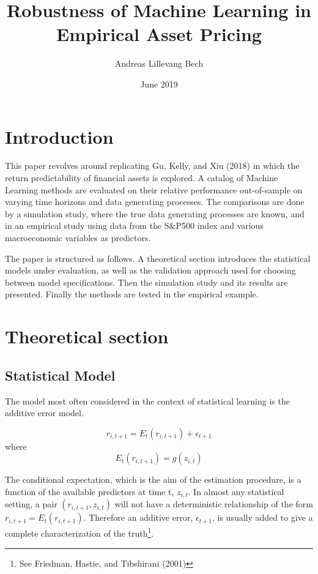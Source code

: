 \documentclass[11pt]{article}
\title{Robustness of Machine Learning in \protect\\
  Empirical Asset Pricing}
\author{Andreas Lillevang Bech}
\date{June 2019}
\let\rmarkdownfootnote\footnote%
\def\footnote{\protect\rmarkdownfootnote}
\begin{document}
\maketitle

\hypertarget{introduction}{%
\section{Introduction}\label{introduction}}

This paper revolves around replicating Gu, Kelly, and Xiu (2018) in
which the return predictability of financial assets is explored. A
catalog of Machine Learning methods are evaluated on their relative
performance out-of-sample on varying time horizons and data generating processes.
The comparisons are done by a simulation study, where the true data generating processes are known, and in an empirical study using data from the S\&P500 index and various macroeconomic variables as predictors.

The paper is structured as follows. A theoretical section introduces the
statistical models under evaluation, as well as the validation approach used for
choosing between model specifications. Then the simulation study and its results are presented. Finally the methods are tested in the empirical example.

\hypertarget{theoretical-section}{%
\section{Theoretical section}\label{theoretical-section}}

\hypertarget{statistical-model}{%
\subsection{Statistical Model}\label{statistical-model}}

The model most often considered in the context of statistical learning
is the additive error model.

\[r_{i,t+1} = E_t(r_{i,t+1}) + \epsilon_{t+1}\] where
\[E_t(r_{i,t+1}) = g(z_{i,t})\]

The conditional expectation, which is the aim of the estimation
procedure, is a function of the available predictors at time t,
\(z_{i,t}\). In almost any statistical setting, a pair \((r_{i,t+1},z_{i,t})\)
will not have a deterministic relationship of the form
\(r_{i,t+1} = E_t(r_{i,t+1})\). Therefore an additive error,
\(\epsilon_{t+1}\), is usually added to give a complete characterization
of the truth\footnote{See Friedman, Hastie, and Tibshirani (2001)}.
\end{document}
